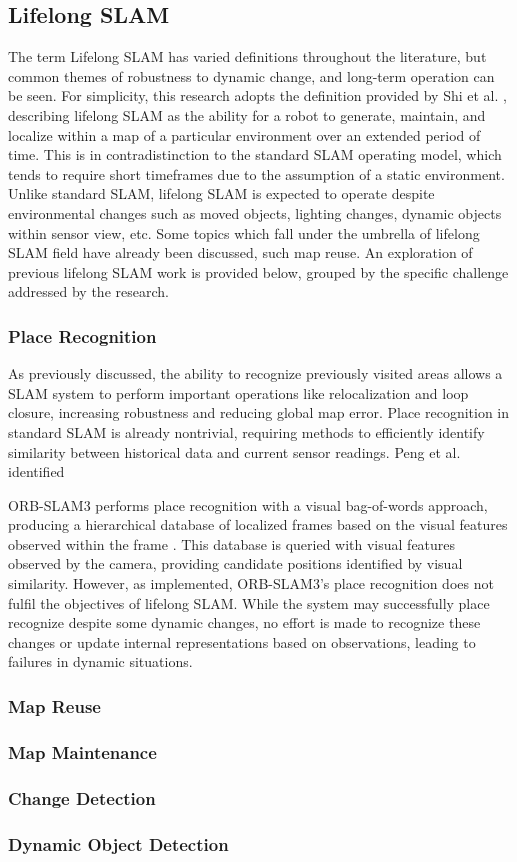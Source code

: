 \subsection{Lifelong SLAM}

The term Lifelong SLAM has varied definitions throughout the literature, but common themes of robustness to dynamic change, and long-term operation can be seen. For simplicity, this research adopts the definition provided by Shi et al. \cite{shiAreWeReady2020}, describing lifelong SLAM as the ability for a robot to generate, maintain, and localize within a map of a particular environment over an extended period of time. This is in contradistinction to the standard SLAM operating model, which tends to require short timeframes due to the assumption of a static environment. Unlike standard SLAM, lifelong SLAM is expected to operate despite environmental changes such as moved objects, lighting changes, dynamic objects within sensor view, etc. Some topics which fall under the umbrella of lifelong SLAM field have already been discussed, such map reuse. An exploration of previous lifelong SLAM work is provided below, grouped by the specific challenge addressed by the research.

\subsubsection{Place Recognition}

As previously discussed, the ability to recognize previously visited areas allows a SLAM system to perform important operations like relocalization and loop closure, increasing robustness and reducing global map error. Place recognition in standard SLAM is already nontrivial, requiring methods to efficiently identify similarity between historical data and current sensor readings. Peng et al. identified 

ORB-SLAM3 performs place recognition with a visual bag-of-words approach, producing a hierarchical database of localized frames based on the visual features observed within the frame \cite{camposORBSLAM3AccurateOpenSource2021}\cite{galvez-lopezBagsBinaryWords2012}. This database is queried with visual features observed by the camera, providing candidate positions identified by visual similarity. However, as implemented, ORB-SLAM3's place recognition does not fulfil the objectives of lifelong SLAM. While the system may successfully place recognize despite some dynamic changes, no effort is made to recognize these changes or update internal representations based on observations, leading to failures in dynamic situations.



\subsubsection{Map Reuse}
\subsubsection{Map Maintenance}
\subsubsection{Change Detection}
\subsubsection{Dynamic Object Detection}
